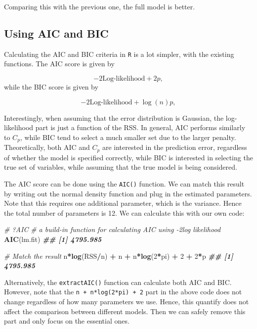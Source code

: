 \documentclass[
]{book}
\newenvironment{Shaded}{\begin{snugshade}}{\end{snugshade}}
\newcommand{\CommentTok}[1]{\textcolor[rgb]{0.56,0.35,0.01}{\textit{#1}}}
\newcommand{\DecValTok}[1]{\textcolor[rgb]{0.00,0.00,0.81}{#1}}
\newcommand{\DocumentationTok}[1]{\textcolor[rgb]{0.56,0.35,0.01}{\textbf{\textit{#1}}}}
\newcommand{\FunctionTok}[1]{\textcolor[rgb]{0.13,0.29,0.53}{\textbf{#1}}}
\newcommand{\NormalTok}[1]{#1}
\newcommand{\SpecialCharTok}[1]{\textcolor[rgb]{0.81,0.36,0.00}{\textbf{#1}}}
\theoremstyle{definition}
\theoremstyle{definition}
\theoremstyle{definition}
\theoremstyle{definition}
\theoremstyle{remark}
\begin{document}
Comparing this with the previous one, the full model is better.

\hypertarget{using-aic-and-bic}{%
\subsection{Using AIC and BIC}\label{using-aic-and-bic}}

Calculating the AIC and BIC criteria in \texttt{R} is a lot simpler, with the existing functions. The AIC score is given by

\[-2 \text{Log-likelihood} + 2 p,\]
while the BIC score is given by

\[-2 \text{Log-likelihood} + \log(n) p,\]

Interestingly, when assuming that the error distribution is Gaussian, the log-likelihood part is just a function of the RSS. In general, AIC performs similarly to \(C_p\), while BIC tend to select a much smaller set due to the larger penalty. Theoretically, both AIC and \(C_p\) are interested in the prediction error, regardless of whether the model is specified correctly, while BIC is interested in selecting the true set of variables, while assuming that the true model is being considered.

The AIC score can be done using the \texttt{AIC()} function. We can match this result by writing out the normal density function and plug in the estimated parameters. Note that this requires one additional parameter, which is the variance. Hence the total number of parameters is 12. We can calculate this with our own code:

\begin{Shaded}
\begin{Highlighting}[]
    \CommentTok{\# ?AIC}
    \CommentTok{\# a build{-}in function for calculating AIC using {-}2log likelihood}
    \FunctionTok{AIC}\NormalTok{(lm.fit) }
\DocumentationTok{\#\# [1] 4795.985}

    \CommentTok{\# Match the result}
\NormalTok{    n}\SpecialCharTok{*}\FunctionTok{log}\NormalTok{(RSS}\SpecialCharTok{/}\NormalTok{n) }\SpecialCharTok{+}\NormalTok{ n }\SpecialCharTok{+}\NormalTok{ n}\SpecialCharTok{*}\FunctionTok{log}\NormalTok{(}\DecValTok{2}\SpecialCharTok{*}\NormalTok{pi) }\SpecialCharTok{+} \DecValTok{2} \SpecialCharTok{+} \DecValTok{2}\SpecialCharTok{*}\NormalTok{p}
\DocumentationTok{\#\# [1] 4795.985}
\end{Highlighting}
\end{Shaded}

Alternatively, the \texttt{extractAIC()} function can calculate both AIC and BIC. However, note that the \texttt{n\ +\ n*log(2*pi)\ +\ 2} part in the above code does not change regardless of how many parameters we use. Hence, this quantify does not affect the comparison between different models. Then we can safely remove this part and only focus on the essential ones.
\end{document}
